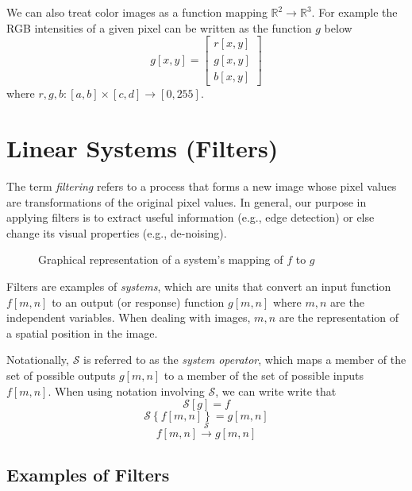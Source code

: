 \documentclass{article}
\begin{document}
We can also treat color images as a function mapping $\mathbb{R}^{2} \to \mathbb{R}^3$. For example the RGB intensities of a given pixel can be written as the function $g$ below
\[
	g[x, y] = \begin{bmatrix} r[x, y] \\ g[x, y] \\ b[x, y] \end{bmatrix} \tag{Color Pixel Intensity}
\]
where $r, g, b: [a, b] \times [c, d] \to [0, 255]$.

\section{Linear Systems (Filters)}

The term \emph{filtering} refers to a process that forms a new image whose pixel values are transformations of the original pixel values. In general, our purpose in applying filters is to extract useful information (e.g., edge detection) or else change its visual properties (e.g., de-noising).

\begin{figure}
\begin{center}
\end{center}
\caption{Graphical representation of a system's mapping of $f$ to $g$}
\end{figure}

Filters are examples of \emph{systems}, which are units that convert an input function $f[m, n]$ to an output (or response) function $g[m, n]$ where $m, n$ are the independent variables. When dealing with images, $m, n$ are the representation of a spatial position in the image.

Notationally, $\mathcal{S}$ is referred to as the \emph{system operator}, which maps a member of the set of possible outputs $g[m, n]$ to a member of the set of possible inputs $f[m, n]$. When using notation involving $\mathcal{S}$, we can write write that 
\[
\mathcal{S}[g] = f
\]
\[
	\mathcal{S}\left\{f[m, n]\right\} = g[m, n]
\]
\[
	f[m, n] \xrightarrow{\mathcal{S}} g[m, n]
\]

\subsection{Examples of Filters}
\end{document}
